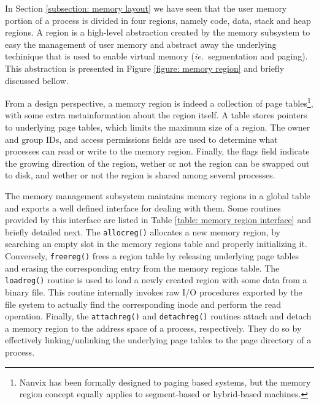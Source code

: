 \documentclass[10pt,a4paper]{article}
\newcommand{\ie}{\textit{ie.\ }}
\begin{document}
In Section \ref{subsection: memory layout} we have seen that the user memory portion of a process is divided in four regions, namely code, data, stack and heap regions. A region is a high-level abstraction created by the memory subsystem to easy the management of user memory and abstract away the underlying techinique that is used to enable virtual memory (\ie segmentation and paging). This abstraction is presented in Figure \ref{figure: memory region} and briefly discussed bellow.

From a design perspective, a memory region is indeed a collection of page tables\footnote{Nanvix has been formally designed to paging based systems, but the memory region concept equally applies to segment-based or hybrid-based machines.}, with some extra metainformation about the region itself. A table stores pointers to underlying page tables, which limits the maximum size of a region. The owner and group IDs, and access permissions fields are used to determine what processes can read or write to the memory region. Finally, the flags field indicate the growing direction of the region, wether or not the region can be swapped out to disk, and wether or not the region is shared among several processes.


The memory management subsystem maintains memory regions in a global table and exports a well defined interface for dealing with them. Some routines provided by this interface are listed in Table \ref{table: memory region interface} and briefly detailed next. The \texttt{allocreg()} allocates a new memory region, by searching an empty slot in the memory regions table and properly initializing it. Conversely, \texttt{freereg()} frees a region table by releasing underlying page tables and erasing the corresponding entry from the memory regions table. The \texttt{loadreg()} routine is used to load a newly created region with some data from a binary file. This routine internally invokes raw I/O procedures exported by the file system to actually find the corresponding inode and perform the read operation. Finally, the \texttt{attachreg()} and \texttt{detachreg()} routines attach and detach a memory region to the address space of a process, respectively. They do so by effectively linking/unlinking the underlying page tables to the page directory of a process.
\end{document}

